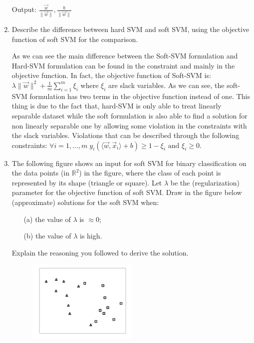 \documentclass[a4paper,11pt,oneside]{book}
\begin{document}
\begin{enumerate}
\begin{solution}
        Output: $\frac{\vec{w}}{\|\vec{w}\|}, \frac{b}{\|\vec{w}\|}$
    \end{solution}
\item Describe the difference between hard SVM and soft SVM, using the objective function of soft SVM for the comparison.
    \begin{solution}
        As we can see the main difference between the Soft-SVM formulation and Hard-SVM formulation can be found in the constraint and mainly in the objective function. In fact, the objective function of Soft-SVM is:
        $\lambda\|\vec{w}\|^2 + \frac{1}{m}\sum_{i=1}^m \xi_i$ where $\xi_i$ are slack variables. As we can see, the soft-SVM formulation has two terms in the objective function instead of one. This thing is due to the fact that, hard-SVM is only able to treat linearly separable dataset while the soft formulation is also able to find a solution for non linearly separable one by allowing some violation in the constraints with the slack variables. Violations that can be described through the following constraints: $\forall i = 1,...,m \; y_i(\langle \vec{w},\vec{x}_i \rangle +b) \geq 1-\xi_i \text{ and } \xi_i \geq 0$.
    \end{solution}

\clearpage
\item The following figure shows an input for soft SVM for binary classification on the data points (in $\mathbb{R}^2$) in the figure, where the class of each point is represented by its shape (triangle or square). Let $\lambda$ be the (regularization) parameter for the objective function of soft SVM. Draw in the figure below (approximate) solutions for the soft SVM when:
    \begin{itemize}
    \item[(a)] the value of $\lambda$ is $\approx 0$;
    \item[(b)] the value of $\lambda$ is high.
    \end{itemize}

    Explain the reasoning you followed to derive the solution.

    \begin{figure}[H]
    \centering
    \includegraphics[width=0.5\textwidth,height=0.4\textheight,keepaspectratio]{images/3_4_Sept_2019.png}
    \end{figure}


\end{enumerate}
\end{document}
